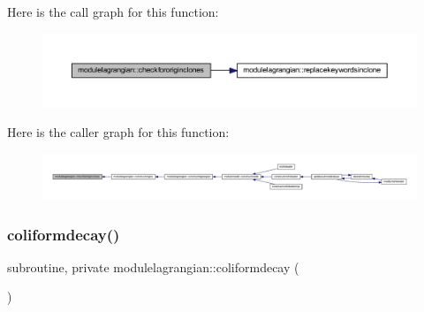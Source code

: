 Here is the call graph for this function\+:\nopagebreak
\begin{figure}[H]
\begin{center}
\leavevmode
\includegraphics[width=350pt]{namespacemodulelagrangian_a80725dbaa881f5358592ca2d92316001_cgraph}
\end{center}
\end{figure}
Here is the caller graph for this function\+:\nopagebreak
\begin{figure}[H]
\begin{center}
\leavevmode
\includegraphics[width=350pt]{namespacemodulelagrangian_a80725dbaa881f5358592ca2d92316001_icgraph}
\end{center}
\end{figure}
\mbox{\label{namespacemodulelagrangian_a24e84b1ba147f10917d0d3cd3564d191}} 
\subsubsection{\texorpdfstring{coliformdecay()}{coliformdecay()}}
{\footnotesize\ttfamily subroutine, private modulelagrangian\+::coliformdecay (\begin{DoxyParamCaption}{ }\end{DoxyParamCaption})\hspace{0.3cm}{\ttfamily [private]}}

